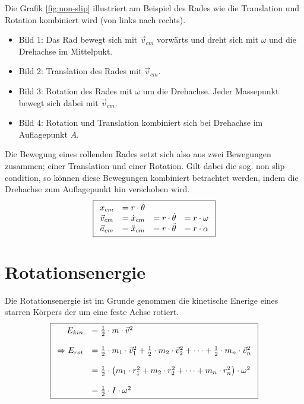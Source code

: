 \noindent
Die Grafik \ref{fig:non-slip} illustriert am Beispiel des Rades wie die 
Translation und Rotation kombiniert wird (von links nach rechts).
\begin{itemize}
	\item{Bild 1:} Das Rad bewegt sich mit $\vec{v}_{cm}$ vorwärts und
		dreht sich mit $\omega$ und die Drehachse im Mittelpukt.
	\item{Bild 2:} Translation des Rades mit $\vec{v}_{cm}$.
	\item{Bild 3:} Rotation des Rades mit $\omega$ um die Drehachse.
		Jeder Massepunkt bewegt sich dabei mit $\vec{v}_{cm}$.
	\item{Bild 4:} Rotation und Translation kombiniert sich bei
		Drehachse im Auflagepunkt $A$.
\end{itemize}
Die Bewegung eines rollenden Rades setzt sich also aus zwei Bewegungen
zusammen; einer Translation und einer Rotation. Gilt dabei die sog. 
non slip condition, so können diese Bewegungen kombiniert betrachtet 
werden, indem die Drehachse zum Auflagepunkt hin verschoben wird. 
\[ \boxed{\begin{array}{c c c c}
	x_{cm} 
		&= r \cdot \theta & &  \\
	\vec{v}_{cm} 
		&= \dot{x}_{cm} 
		&= r \cdot \dot{\theta }
		& =r \cdot \omega \\
	\vec{a}_{cm} 
		&= \ddot{x}_{cm}
		&= r \cdot \ddot{\theta}
		&= r \cdot \alpha
\end{array}}\]

\section{Rotationsenergie}
Die Rotationsenergie ist im Grunde genommen die kinetische Enerige
eines starren Körpers der um eine feste Achse rotiert.
\[ \boxed{\begin{array}{r l}
	E_{kin} & = \frac{1}{2} \cdot m \cdot \vec{v}^2 \\
	& \\
	\Rightarrow E_{rot} & = \frac{1}{2} \cdot m_1 \cdot \vec{v}_1^2
			+ \frac{1}{2} \cdot m_2 \cdot \vec{v}_2^2
			+ \dots 
			+ \frac{1}{2} \cdot m_n \cdot \vec{v}_n^2 \\
	& \\
		& = \frac{1}{2} \cdot \left(m_1 \cdot r_1^2
			+ m_2 \cdot r_2^2 
			+ \dots
			+ m_n \cdot r_n^2\right) \cdot \omega^2 \\
	& \\
		& = \frac{1}{2} \cdot I \cdot \omega^2 
\end{array} } \]

